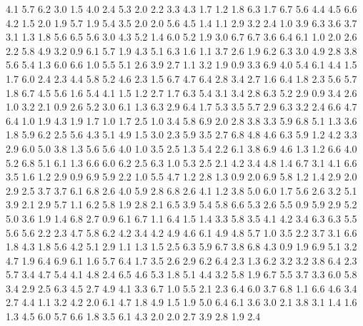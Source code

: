 4.1 5.7 6.2 3.0 1.5 4.0 2.4 5.3 2.0 2.2 
3.3 4.3 1.7 1.2 1.8 6.3 1.7 6.7 5.6 4.4 
4.5 6.6 4.2 1.5 2.0 1.9 5.7 1.9 5.4 3.5 
2.0 2.0 5.6 4.5 1.4 1.1 2.9 3.2 2.4 1.0 
3.9 6.3 3.6 3.7 3.1 1.3 1.8 5.6 6.5 5.6 
3.0 4.3 5.2 1.4 6.0 5.2 1.9 3.0 6.7 6.7 
3.6 6.4 6.1 1.0 2.0 2.6 2.2 5.8 4.9 3.2 
0.9 6.1 5.7 1.9 4.3 5.1 6.3 1.6 1.1 3.7 
2.6 1.9 6.2 6.3 3.0 4.9 2.8 3.8 5.6 5.4 
1.3 6.0 6.6 1.0 5.5 5.1 2.6 3.9 2.7 1.1 
3.2 1.9 0.9 3.3 6.9 4.0 5.4 6.1 4.4 1.5 
1.7 6.0 2.4 2.3 4.4 5.8 5.2 4.6 2.3 1.5 
6.7 4.7 6.4 2.8 3.4 2.7 1.6 6.4 1.8 2.3 
5.6 5.7 1.8 6.7 4.5 5.6 1.6 5.4 4.1 1.5 
1.2 2.7 1.7 6.3 5.4 3.1 3.4 2.8 6.3 5.2 
2.9 0.9 3.4 2.6 1.0 3.2 2.1 0.9 2.6 5.2 
3.0 6.1 1.3 6.3 2.9 6.4 1.7 5.3 3.5 5.7 
2.9 6.3 3.2 2.4 6.6 4.7 6.4 1.0 1.9 4.3 
1.9 1.7 1.0 1.7 2.5 1.0 3.4 5.8 6.9 2.0 
2.8 3.8 3.3 5.9 6.8 5.1 1.3 3.6 1.8 5.9 
6.2 2.5 5.6 4.3 5.1 4.9 1.5 3.0 2.3 5.9 
3.5 2.7 6.8 4.8 4.6 6.3 5.9 1.2 4.2 3.3 
2.9 6.0 5.0 3.8 1.3 5.6 5.6 4.0 1.0 3.5 
2.5 1.3 5.4 2.2 6.1 3.8 6.9 4.6 1.3 1.2 
6.6 4.0 5.2 6.8 5.1 6.1 1.3 6.6 6.0 6.2 
2.5 6.3 1.0 5.3 2.5 2.1 4.2 3.4 4.8 1.4 
6.7 3.1 4.1 6.6 3.5 1.6 1.2 2.9 0.9 6.9 
5.9 2.2 1.0 5.5 4.7 1.2 2.8 1.3 0.9 2.0 
6.9 5.8 1.2 1.4 2.9 2.0 2.9 2.5 3.7 3.7 
6.1 6.8 2.6 4.0 5.9 2.8 6.8 2.6 4.1 1.2 
3.8 5.0 6.0 1.7 5.6 2.6 3.2 5.1 3.9 2.1 
2.9 5.7 1.1 6.2 5.8 1.9 2.8 2.1 6.5 3.9 
5.4 5.8 6.6 5.3 2.6 5.5 0.9 5.9 2.9 5.2 
5.0 3.6 1.9 1.4 6.8 2.7 0.9 6.1 6.7 1.1 
6.4 1.5 1.4 3.3 5.8 3.5 4.1 4.2 3.4 6.3 
6.3 5.5 5.6 5.6 2.2 2.3 4.7 5.8 6.2 4.2 
3.4 4.2 4.9 4.6 6.1 4.9 4.8 5.7 1.0 3.5 
2.2 3.7 3.1 6.6 1.8 4.3 1.8 5.6 4.2 5.1 
2.9 1.1 1.3 1.5 2.5 6.3 5.9 6.7 3.8 6.8 
4.3 0.9 1.9 6.9 5.1 3.2 4.7 1.9 6.4 6.9 
6.1 1.6 5.7 6.4 1.7 3.5 2.6 2.9 6.2 6.4 
2.3 1.3 6.2 3.2 3.2 3.8 6.4 2.3 5.7 3.4 
4.7 5.4 4.1 4.8 2.4 6.5 4.6 5.3 1.8 5.1 
4.4 3.2 5.8 1.9 6.7 5.5 3.7 3.3 6.0 5.8 
3.4 2.9 2.5 6.3 4.5 2.7 4.9 4.1 3.3 6.7 
1.0 5.5 2.1 2.3 6.4 6.0 3.7 6.8 1.1 6.6 
4.6 3.4 2.7 4.4 1.1 3.2 4.2 2.0 6.1 4.7 
1.8 4.9 1.5 1.9 5.0 6.4 6.1 3.6 3.0 2.1 
3.8 3.1 1.4 1.6 1.3 4.5 6.0 5.7 6.6 1.8 
3.5 6.1 4.3 2.0 2.0 2.7 3.9 2.8 1.9 2.4
